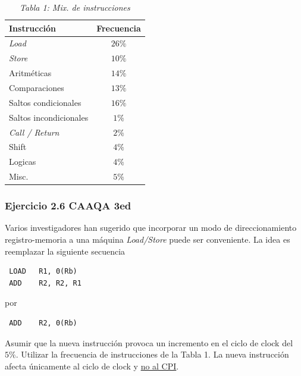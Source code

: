 \documentclass{beamer}
\begin{document}
\begin{frame}

         \begin{center}
         \begin{table}
         \begin{tabular}{||l|c||}
         \hline
         Instrucción & Frecuencia \\\hline
         \textit{Load} & $26\%$ \\\hline
         \textit{Store} & $10\%$ \\\hline
         Aritméticas & $14\%$ \\\hline
         Comparaciones & $13\%$ \\\hline
         Saltos condicionales & $16\%$ \\\hline
         Saltos incondicionales & $1\%$ \\\hline
         \textit{Call / Return} & $2\%$ \\\hline
         Shift & $4\%$ \\\hline
         Logicas & $4\%$ \\\hline
         Misc. & $5\%$ \\\hline

         \end{tabular}
                           \caption*{\textit{Tabla 1: Mix. de instrucciones}} \label{tab:tabla1} %
\end{table}
         \end{center}

\end{frame}
     
\begin{frame}[fragile]
 \frametitle{Ejercicio 2.6 CAAQA 3ed}
Varios investigadores han sugerido que incorporar un modo de direccionamiento registro-memoria a una máquina \textit{Load/Store} puede ser conveniente. La idea es reemplazar la siguiente secuencia
 
\begin{lstlisting}
 LOAD   R1, 0(Rb)
 ADD    R2, R2, R1
\end{lstlisting}

por

\begin{lstlisting}
 ADD    R2, 0(Rb)
\end{lstlisting}


Asumir que la nueva instrucción provoca un incremento en el ciclo de clock del $5\%$. Utilizar la frecuencia de instrucciones de la Tabla 1. La nueva instrucción afecta únicamente al ciclo de clock y \underline{no al CPI}.

\end{frame}
\end{document}
